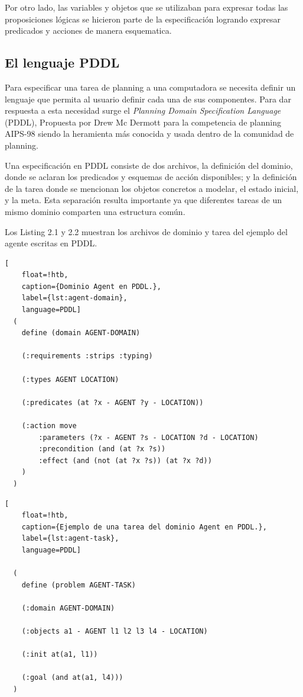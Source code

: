 Por otro lado, las variables y objetos que se utilizaban para expresar todas las
proposiciones lógicas se hicieron parte de la especificación logrando expresar
predicados y acciones de manera esquematica.

\subsection{El lenguaje PDDL}

Para especificar una tarea de planning a una computadora se necesita definir un
lenguaje que permita al usuario definir cada una de sus componentes. Para dar
respuesta a esta necesidad surge el \emph{Planning Domain Specification
Language} (PDDL), Propuesta por Drew Mc Dermott para la competencia de planning
AIPS-98 \citep{McDermott1998} siendo la heramienta más conocida y usada dentro
de la comunidad de planning.

Una especificación en PDDL consiste de dos archivos, la definición del dominio,
donde se aclaran los predicados y esquemas de acción disponibles; y la
definición de la tarea donde se mencionan los objetos concretos a modelar, el
estado inicial, y la meta. Esta separación resulta importante ya que diferentes
tareas de un mismo dominio comparten una estructura común.

Los Listing 2.1 y 2.2 muestran los archivos de dominio y tarea del ejemplo del
agente escritas en PDDL.

\begin{lstlisting}[
    float=!htb,
    caption={Dominio Agent en PDDL.},
    label={lst:agent-domain},
    language=PDDL]
  (
    define (domain AGENT-DOMAIN)

    (:requirements :strips :typing)

    (:types AGENT LOCATION)

    (:predicates (at ?x - AGENT ?y - LOCATION))

    (:action move
        :parameters (?x - AGENT ?s - LOCATION ?d - LOCATION)
        :precondition (and (at ?x ?s))
        :effect (and (not (at ?x ?s)) (at ?x ?d))
    )
  )
\end{lstlisting}

\begin{lstlisting}[
    float=!htb,
    caption={Ejemplo de una tarea del dominio Agent en PDDL.},
    label={lst:agent-task},
    language=PDDL]

  (
    define (problem AGENT-TASK)

    (:domain AGENT-DOMAIN)

    (:objects a1 - AGENT l1 l2 l3 l4 - LOCATION)

    (:init at(a1, l1))
    
    (:goal (and at(a1, l4)))
  )
\end{lstlisting}

